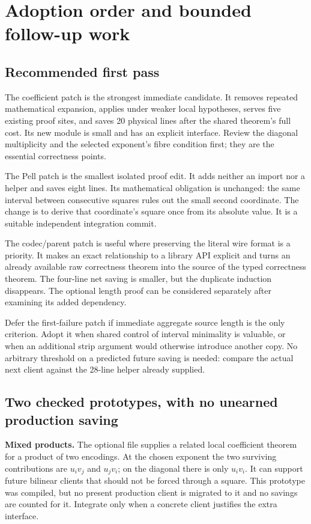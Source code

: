 \section{Adoption order and bounded follow-up work}

\subsection{Recommended first pass}

The coefficient patch is the strongest immediate candidate. It removes
repeated mathematical expansion, applies under weaker local hypotheses,
serves five existing proof sites, and saves 20 physical lines after the
shared theorem's full cost. Its new module is small and has an explicit
interface. Review the diagonal multiplicity and the selected exponent's
fibre condition first; they are the essential correctness points.

The Pell patch is the smallest isolated proof edit. It adds neither an
import nor a helper and saves eight lines. Its mathematical obligation is
unchanged: the same interval between consecutive squares rules out the
small second coordinate. The change is to derive that coordinate's square
once from its absolute value. It is a suitable independent integration
commit.

The codec/parent patch is useful where preserving the literal wire format
is a priority. It makes an exact relationship to a library API explicit and
turns an already available raw correctness theorem into the source of the
typed correctness theorem. The four-line net saving is smaller, but the
duplicate induction disappears. The optional length proof can be considered
separately after examining its added  dependency.

Defer the first-failure patch if immediate aggregate source length is the
only criterion. Adopt it when shared control of interval minimality is
valuable, or when an additional strip argument would otherwise introduce
another copy. No arbitrary threshold on a predicted future saving is needed:
compare the actual next client against the 28-line helper already supplied.

\subsection{Two checked prototypes, with no unearned production saving}

\textbf{Mixed products.} The optional  file supplies a
related local coefficient theorem for a product of two encodings. At the
chosen exponent the two surviving contributions are \(u_i v_j\) and
\(u_j v_i\); on the diagonal there is only \(u_i v_i\). It can support
future bilinear clients that should not be forced through a square. This
prototype was compiled, but no present production client is migrated to
it and no savings are counted for it. Integrate only when a concrete client
justifies the extra interface.

